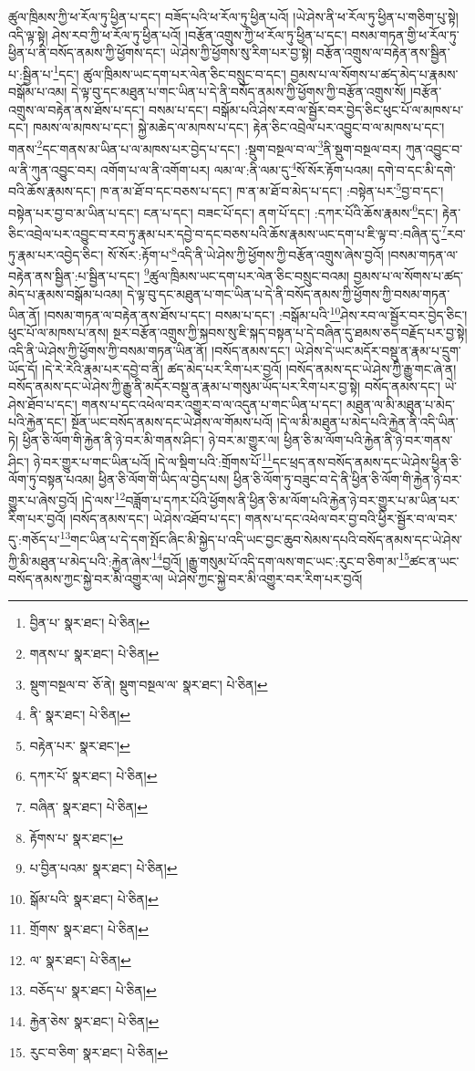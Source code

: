 ཚུལ་ཁྲིམས་ཀྱི་ཕ་རོལ་ཏུ་ཕྱིན་པ་དང་། བཟོད་པའི་ཕ་རོལ་ཏུ་ཕྱིན་པའོ། །ཡེ་ཤེས་ནི་ཕ་རོལ་ཏུ་ཕྱིན་པ་གཅིག་པུ་སྟེ། འདི་ལྟ་སྟེ། ཤེས་རབ་ཀྱི་ཕ་རོལ་ཏུ་ཕྱིན་པའོ། །བརྩོན་འགྲུས་ཀྱི་ཕ་རོལ་ཏུ་ཕྱིན་པ་དང་། བསམ་གཏན་གྱི་ཕ་རོལ་ཏུ་ཕྱིན་པ་ནི་བསོད་ནམས་ཀྱི་ཕྱོགས་དང་། ཡེ་ཤེས་ཀྱི་ཕྱོགས་སུ་རིག་པར་བྱ་སྟེ། བརྩོན་འགྲུས་ལ་བརྟེན་ནས་སྦྱིན་པ་:སྦྱིན་པ་\footnote{བྱིན་པ་  སྣར་ཐང་།  པེ་ཅིན། }དང་། ཚུལ་ཁྲིམས་ཡང་དག་པར་ལེན་ཅིང་བསྲུང་བ་དང་། བྱམས་པ་ལ་སོགས་པ་ཚད་མེད་པ་རྣམས་བསྒོམ་པ་འམ། དེ་ལྟ་བུ་དང་མཐུན་པ་གང་ཡིན་པ་དེ་ནི་བསོད་ནམས་ཀྱི་ཕྱོགས་ཀྱི་བརྩོན་འགྲུས་སོ། །བརྩོན་འགྲུས་ལ་བརྟེན་ནས་ཐོས་པ་དང་། བསམ་པ་དང་། བསྒོམ་པའི་ཤེས་རབ་ལ་སྦྱོར་བར་བྱེད་ཅིང་ཕུང་པོ་ལ་མཁས་པ་དང་། ཁམས་ལ་མཁས་པ་དང་། སྐྱེ་མཆེད་ལ་མཁས་པ་དང་། རྟེན་ཅིང་འབྲེལ་པར་འབྱུང་བ་ལ་མཁས་པ་དང་། གནས་\footnote{གནས་པ་  སྣར་ཐང་།  པེ་ཅིན། }དང་གནས་མ་ཡིན་པ་ལ་མཁས་པར་བྱེད་པ་དང་། :སྡུག་བསྔལ་བ་ལ་\footnote{སྡུག་བསྔལ་བ་  ཅོ་ནེ། སྡུག་བསྔལ་ལ་  སྣར་ཐང་།  པེ་ཅིན། }ནི་སྡུག་བསྔལ་བར། ཀུན་འབྱུང་བ་ལ་ནི་ཀུན་འབྱུང་བར། འགོག་པ་ལ་ནི་འགོག་པར། ལམ་ལ་:ནི་ལམ་དུ་\footnote{ནི་  སྣར་ཐང་།  པེ་ཅིན། }སོ་སོར་རྟོག་པའམ། དགེ་བ་དང་མི་དགེ་བའི་ཆོས་རྣམས་དང་། ཁ་ན་མ་ཐོ་བ་དང་བཅས་པ་དང་། ཁ་ན་མ་ཐོ་བ་མེད་པ་དང་། :བསྟེན་པར་\footnote{བརྟེན་པར་  སྣར་ཐང་། }བྱ་བ་དང་། བསྟེན་པར་བྱ་བ་མ་ཡིན་པ་དང་། ངན་པ་དང་། བཟང་པོ་དང་། ནག་པོ་དང་། :དཀར་པོའི་ཆོས་རྣམས་\footnote{དཀར་པོ་  སྣར་ཐང་།  པེ་ཅིན། }དང་། རྟེན་ཅིང་འབྲེལ་པར་འབྱུང་བ་རབ་ཏུ་རྣམ་པར་དབྱེ་བ་དང་བཅས་པའི་ཆོས་རྣམས་ཡང་དག་པ་ཇི་ལྟ་བ་:བཞིན་དུ་\footnote{བཞིན་  སྣར་ཐང་།  པེ་ཅིན། }རབ་ཏུ་རྣམ་པར་འབྱེད་ཅིང་། སོ་སོར་:རྟོག་པ་\footnote{རྟོགས་པ་  སྣར་ཐང་། }འདི་ནི་ཡེ་ཤེས་ཀྱི་ཕྱོགས་ཀྱི་བརྩོན་འགྲུས་ཞེས་བྱའོ། །བསམ་གཏན་ལ་བརྟེན་ནས་སྦྱིན་:པ་སྦྱིན་པ་དང་། \footnote{པ་བྱིན་པའམ་  སྣར་ཐང་།  པེ་ཅིན། }ཚུལ་ཁྲིམས་ཡང་དག་པར་ལེན་ཅིང་བསྲུང་བའམ། བྱམས་པ་ལ་སོགས་པ་ཚད་མེད་པ་རྣམས་བསྒོམ་པའམ། དེ་ལྟ་བུ་དང་མཐུན་པ་གང་ཡིན་པ་དེ་ནི་བསོད་ནམས་ཀྱི་ཕྱོགས་ཀྱི་བསམ་གཏན་ཡིན་ནོ། །བསམ་གཏན་ལ་བརྟེན་ནས་ཐོས་པ་དང་། བསམ་པ་དང་། :བསྒོམ་པའི་\footnote{སྒོམ་པའི་  སྣར་ཐང་།  པེ་ཅིན། }ཤེས་རབ་ལ་སྦྱོར་བར་བྱེད་ཅིང་། ཕུང་པོ་ལ་མཁས་པ་ནས། སྔར་བརྩོན་འགྲུས་ཀྱི་སྐབས་སུ་ཇི་སྐད་བསྟན་པ་དེ་བཞིན་དུ་ཐམས་ཅད་བརྗོད་པར་བྱ་སྟེ། འདི་ནི་ཡེ་ཤེས་ཀྱི་ཕྱོགས་ཀྱི་བསམ་གཏན་ཡིན་ནོ། །བསོད་ནམས་དང་། ཡེ་ཤེས་དེ་ཡང་མདོར་བསྡུ་ན་རྣམ་པ་དྲུག་ཡོད་དོ། །དེ་རེ་རེའི་རྣམ་པར་དབྱེ་བ་ནི། ཚད་མེད་པར་རིག་པར་བྱའོ། །བསོད་ནམས་དང་ཡེ་ཤེས་ཀྱི་རྒྱུ་གང་ཞེ་ན། བསོད་ནམས་དང་ཡེ་ཤེས་ཀྱི་རྒྱུ་ནི་མདོར་བསྡུ་ན་རྣམ་པ་གསུམ་ཡོད་པར་རིག་པར་བྱ་སྟེ། བསོད་ནམས་དང་། ཡེ་ཤེས་ཐོབ་པ་དང་། གནས་པ་དང་འཕེལ་བར་འགྱུར་བ་ལ་འདུན་པ་གང་ཡིན་པ་དང་། མཐུན་ལ་མི་མཐུན་པ་མེད་པའི་རྐྱེན་དང་། སྔོན་ཡང་བསོད་ནམས་དང་ཡེ་ཤེས་ལ་གོམས་པའོ། །དེ་ལ་མི་མཐུན་པ་མེད་པའི་རྐྱེན་ནི་འདི་ཡིན་ཏེ། ཕྱིན་ཅི་ལོག་གི་རྐྱེན་ནི་ཉེ་བར་མི་གནས་ཤིང་། ཉེ་བར་མ་གྱུར་ལ། ཕྱིན་ཅི་མ་ལོག་པའི་རྐྱེན་ནི་ཉེ་བར་གནས་ཤིང་། ཉེ་བར་གྱུར་པ་གང་ཡིན་པའོ། །དེ་ལ་སྡིག་པའི་:གྲོགས་པོ་\footnote{གྲོགས་  སྣར་ཐང་།  པེ་ཅིན། }དང་ཕྲད་ནས་བསོད་ནམས་དང་ཡེ་ཤེས་ཕྱིན་ཅི་ལོག་ཏུ་བསྟན་པའམ། ཕྱིན་ཅི་ལོག་གི་ཡིད་ལ་བྱེད་པས། ཕྱིན་ཅི་ལོག་ཏུ་བཟུང་བ་དེ་ནི་ཕྱིན་ཅི་ལོག་གི་རྐྱེན་ཉེ་བར་གྱུར་པ་ཞེས་བྱའོ། །དེ་ལས་\footnote{ལ་  སྣར་ཐང་།  པེ་ཅིན། }བཟློག་པ་དཀར་པོའི་ཕྱོགས་ནི་ཕྱིན་ཅི་མ་ལོག་པའི་རྐྱེན་ཉེ་བར་གྱུར་པ་མ་ཡིན་པར་རིག་པར་བྱའོ། །བསོད་ནམས་དང་། ཡེ་ཤེས་འཐོབ་པ་དང་། གནས་པ་དང་འཕེལ་བར་བྱ་བའི་ཕྱིར་སྦྱོར་བ་ལ་བར་དུ་:གཅོད་པ་\footnote{བཅོད་པ་  སྣར་ཐང་།  པེ་ཅིན། }གང་ཡིན་པ་དེ་དག་སྤོང་ཞིང་མི་སྐྱེད་པ་འདི་ཡང་བྱང་ཆུབ་སེམས་དཔའི་བསོད་ནམས་དང་ཡེ་ཤེས་ཀྱི་མི་མཐུན་པ་མེད་པའི་:རྐྱེན་ཞེས་\footnote{རྐྱེན་ཅེས་  སྣར་ཐང་།  པེ་ཅིན། }བྱའོ། །རྒྱུ་གསུམ་པོ་འདི་དག་ལས་གང་ཡང་:རུང་བ་ཅིག་མ་\footnote{རུང་བ་ཅིག་  སྣར་ཐང་།  པེ་ཅིན། }ཚང་ན་ཡང་བསོད་ནམས་ཀྱང་སྐྱེ་བར་མི་འགྱུར་ལ། ཡེ་ཤེས་ཀྱང་སྐྱེ་བར་མི་འགྱུར་བར་རིག་པར་བྱའོ། 